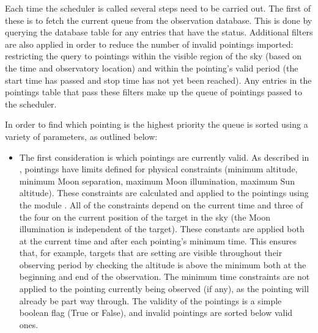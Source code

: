 \begin{colsection}
\begin{colsection}
Each time the scheduler is called several steps need to be carried out. The first of these is to fetch the current queue from the observation database. This is done by querying the database  table for any entries that have the  status. Additional filters are also applied in order to reduce the number of invalid pointings imported: restricting the query to pointings within the visible region of the sky (based on the time and observatory location) and within the pointing's valid period (the start time has passed and stop time has not yet been reached). Any entries in the pointings table that pass these filters make up the queue of pointings passed to the scheduler.

In order to find which pointing is the highest priority the queue is sorted using a variety of parameters, as outlined below:

\begin{itemize}

\item The first consideration is which pointings are currently valid. As described in , pointings have limits defined for physical constraints (minimum altitude, minimum Moon separation, maximum Moon illumination, maximum Sun altitude). These constraints are calculated and applied to the pointings using the   module \citep{astroplan}. All of the constraints depend on the current time and three of the four on the current position of the target in the sky (the Moon illumination is independent of the target). These constants are applied both at the current time and after each pointing's minimum time. This ensures that, for example, targets that are setting are visible throughout their observing period by checking the altitude is above the minimum both at the beginning and end of the observation. The minimum time constraints are not applied to the pointing currently being observed (if any), as the pointing will already be part way through. The validity of the pointings is a simple boolean flag (True or False), and invalid pointings are sorted below valid ones.


\end{itemize}
\end{colsection}
\end{colsection}
